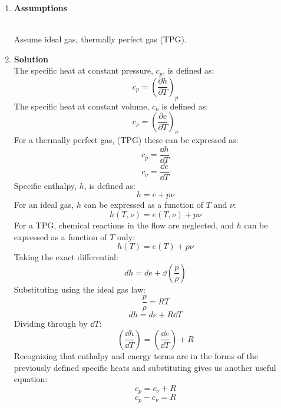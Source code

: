 \documentclass[12pt,letterpaper]{article}
\begin{document}
\begin{enumerate}[label=(\alph*)]
\begin{enumerate}[label=\arabic*.]
			\item{\textbf{Assumptions}}
			\\
			Assume ideal gas, thermally perfect gas (TPG).
			\item{\textbf{Solution}}\\
			The specific heat at constant pressure, $c_p$, is defined as:
			\begin{equation*}
				c_p = \left(\frac{\partial h}{\partial T}\right)_p
			\end{equation*}
			The specific heat at constant volume, $c_{\nu}$ is defined as:
			\begin{equation*}
				c_{\nu} = \left(\frac{\partial e}{\partial T}\right)_{\nu}
			\end{equation*}		
			For a thermally perfect gas, (TPG) these can be expressed as:
			\begin{equation*}
				c_p = \frac{\dd h}{\dd T}
			\end{equation*}	
			\begin{equation*}
				c_{\nu} = \frac{\dd e}{\dd T}
			\end{equation*}	
			Specific enthalpy, $h$, is defined as:
			\begin{equation*}
				h = e + p\nu
			\end{equation*}
			For an ideal gas, $h$ can be expressed as a function of $T$ and $\nu$:
			\begin{equation*}
				h(T,\nu) = e(T,\nu) + p\nu
			\end{equation*}
			For a TPG, chemical reactions in the flow are neglected, and $h$ can be expressed as a function of $T$ only:
			\begin{equation*}
				h(T) = e(T) + p\nu
			\end{equation*}
			Taking the exact differential:
			\begin{equation*}
				dh = de + \dd (\frac{p}{\rho})
			\end{equation*}
			Substituting using the ideal gas law:
			\begin{equation*}
				\frac{p}{\rho} = RT
			\end{equation*}
			\begin{equation*}
				dh = de + R\dd T
			\end{equation*}
			Dividing through by $\dd T$:
			\begin{equation*}
				\left(\frac{\dd h}{\dd T}\right) = \left(\frac{\dd e}{\dd T}\right) + R
			\end{equation*}
			Recognizing that enthalpy and energy terms are in the forms of the previously defined specific heats and substituting gives us another useful equation:
			\begin{equation*}
				c_p = c_{\nu} + R
			\end{equation*}
			\begin{equation*}
				\boxed{c_p - c_{\nu} = R}
			\end{equation*}
		

\end{enumerate}
\end{enumerate}
\end{document}
